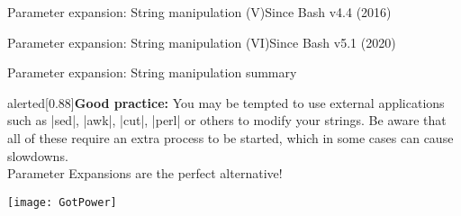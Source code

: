\begin{frame}[fragile]{Parameter expansion: String manipulation (V)}{Since Bash v4.4 (2016)}
\end{frame}
\begin{frame}[fragile]{Parameter expansion: String manipulation (VI)}{Since Bash v5.1 (2020)}
\end{frame}
\begin{frame}{Parameter expansion: String manipulation summary}
    \vspace{-3mm}
    \begin{varblock}{alerted}[0.88\textwidth]{\textbf{Good practice:}}
        You may be tempted to use external applications such as \bash|sed|, \bash|awk|, \bash|cut|, \bash|perl| or others to modify your strings.
        Be aware that all of these require an extra process to be started, which in some cases can cause slowdowns.\\
        \alert{Parameter Expansions are the perfect alternative!}
    \end{varblock}
    \bigskip
    \centerline{\texttt{[image: GotPower]}}
\end{frame}
